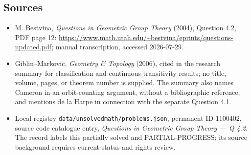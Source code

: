 \documentclass[11pt]{article}
\begin{document}
\subsection{Sources}
\begin{itemize}
\item M. Bestvina, \emph{Questions in Geometric Group Theory} (2004), Question 4.2, PDF page 12: \url{https://www.math.utah.edu/~bestvina/eprints/questions-updated.pdf}; manual transcription, accessed 2026-07-29.
\item Giblin--Markovic, \emph{Geometry \& Topology} (2006), cited in the research summary for classification and continuous-transitivity results; no title, volume, pages, or theorem number is supplied. The summary also names Cameron in an orbit-counting argument, without a bibliographic reference, and mentions de la Harpe in connection with the separate Question 4.1.
\item Local registry \texttt{data/unsolvedmath/problems.json}, permanent ID $1100402$, source code catalogue entry, \emph{Questions in Geometric Group Theory --- Q 4.2}. The record labels this partially solved and PARTIAL-PROGRESS; its source background requires current-status and rights review.
\end{itemize}
\end{document}
